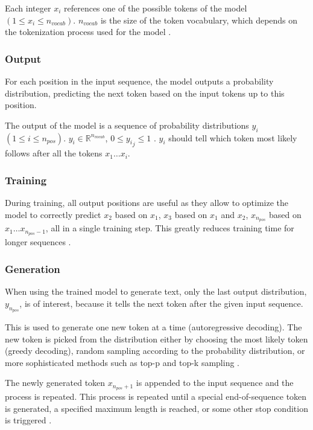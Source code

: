 Each integer $x_i$ references one of the possible tokens of the model $(1 \leq x_i \leq n_{vocab})$. $n_{vocab}$ is the size of the token vocabulary, which depends on the tokenization process used for the model .

\subsubsection{Output}

\label{transformer:output}

For each position in the input sequence, the model outputs a probability distribution, predicting the next token based on the input tokens up to this position. 

The output of the model is a sequence of probability distributions $y_i$ $(1 \leq i \leq n_{pos})$. $y_i \in \mathbb{R}^{n_{vocab}}$, $0 \leq {y_i}_j \leq 1$  \cite{HuggingFaceGPT2}.
$y_i$ should tell which token most likely follows after all the tokens $x_1 \ldots x_i$.

\subsubsection{Training}

During training, all output positions are useful as they allow to optimize the model to correctly predict $x_2$ based on $x_1$,
$x_3$ based on $x_1$ and $x_2$, $x_{n_{pos}}$ based on $x_1 \ldots x_{n_{pos}-1}$, all in a single training step. This greatly reduces training time for longer sequences \cite{alammar-gpt2}.

\subsubsection{Generation}

When using the trained model to generate text, only the last output distribution, $y_{n_{pos}}$, is of interest, because
it tells the next token after the given input sequence. \cite{Mao2021Autoregressive}

This is used to generate one new token at a time (autoregressive decoding). The new token is picked from the distribution either by choosing the most likely token (greedy decoding), random sampling according to the probability distribution, or more sophisticated methods such as top-p and top-k sampling \cite{ippolito2019comparison}.

The newly generated token $x_{n_{pos}+1}$ is appended to the input sequence and the process is repeated. This process is repeated until a special end-of-sequence token is generated, a specified maximum length is reached, or some other stop condition is triggered \cite[sect. "Generation"]{HuggingFaceGPT2}.

